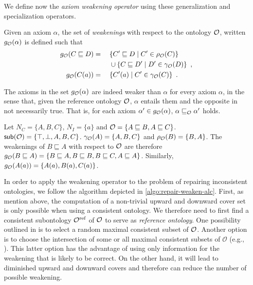 We define now the \emph{axiom weakening operator} using these generalization and specialization operators.

\begin{definition}
  Given an axiom $\alpha$, the set of \emph{weakenings} with respect to the ontology $\mathcal{O}$, written $g_\mathcal{O}(\alpha)$ is defined such that
  \begin{alignat*}{2}
    g_\mathcal{O}(C \sqsubseteq D) &={} && \{ C' \sqsubseteq D \mid C' \in \rho_\mathcal{O} (C) \} \\
    &&& \cup \{ C \sqsubseteq D' \mid D' \in \gamma_\mathcal{O}(D) \} \enspace, \\
    g_\mathcal{O}(C(a)) &={} && \{ C'(a) \mid C' \in \gamma_\mathcal{O}(C) \} \enspace.
  \end{alignat*}
\end{definition}

The axioms in the set $g_\mathcal{O}(\alpha)$ are indeed weaker than $\alpha$ for every axiom $\alpha$, in the sense that, given the reference ontology $\mathcal{O}$, $\alpha$ entails them and the opposite in not necessarily true. That is, for each axiom $\alpha' \in g_\mathcal{O}(\alpha)$, $\alpha \sqsubseteq_\mathcal{O} \alpha'$ holds.

\begin{example}
  Let $N_C = \{ A, B, C \}$, $N_I = \{ a \}$ and $\mathcal{O} = \{ A \sqsubseteq B, A \sqsubseteq C \}$. ${\mathsf{sub}}(\mathcal{O}) = \{\top, \bot, A, B, C\}$. $\gamma_\mathcal{O}(A) = \{ A, B, C \}$ and $\rho_\mathcal{O}(B) = \{ B, A \}$. The weakenings of $B \sqsubseteq A$ with respect to $\mathcal{O}$ are therefore $g_\mathcal{O}(B \sqsubseteq A) = \{ B \sqsubseteq A, B \sqsubseteq B, B \sqsubseteq C, A \sqsubseteq A \}$. Similarly, $g_\mathcal{O}(A(a)) = \{ A(a), B(a), C(a) \}$.
\end{example}

In order to apply the weakening operator to the problem of repairing inconsistent ontologies, we follow the algorithm depicted in \cref{algo:repair-weaken-alc}. First, as mention above, the computation of a non-trivial upward and downward cover set is only possible when using a consistent ontology. We therefore need to first find a consistent subontology ${\mathcal{O}^\textnormal{ref}}$ of $\mathcal{O}$ to serve as \emph{reference ontology}. One possibility outlined in \cite{troquard2018repairing} is to select a random maximal consistent subset of $\mathcal{O}$. Another option is to choose the intersection of some or all maximal consistent subsets of $\mathcal{O}$ (e.g., \cite{LLRRS10}). This latter option has the advantage of using only information for the weakening that is likely to be correct. On the other hand, it will lead to diminished upward and downward covers and therefore can reduce the number of possible weakening.

